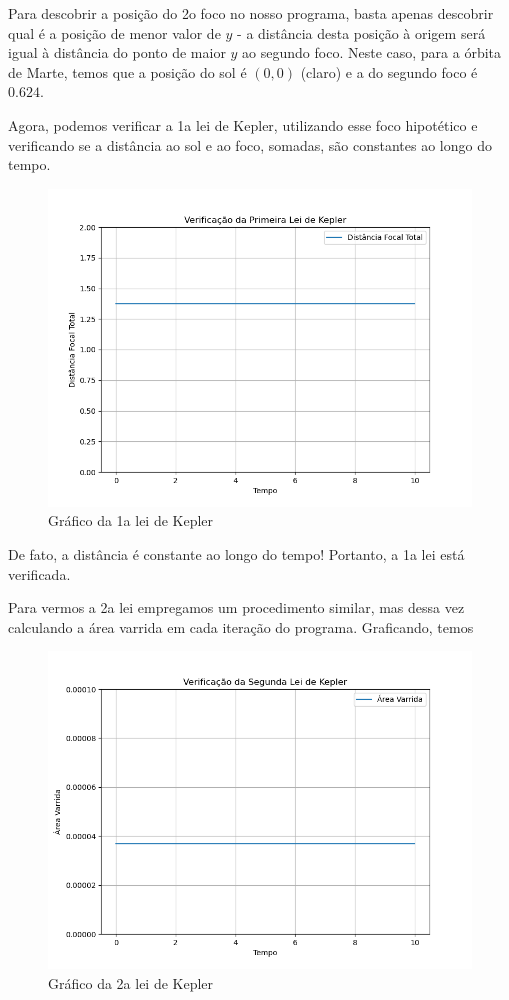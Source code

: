 \documentclass[12pt,a4paper]{article}
\begin{document}
Para descobrir a posição do 2o foco no nosso programa, basta apenas descobrir qual é a posição de menor valor de $y$ - a distância desta posição à origem será igual à distância do ponto de maior $y$ ao segundo foco. Neste caso, para a órbita de Marte, temos que a posição do sol é $(0,0)$ (claro) e a do segundo foco é $0.624$.

Agora, podemos verificar a 1a lei de Kepler, utilizando esse foco hipotético e verificando se a distância ao sol e ao foco, somadas, são constantes ao longo do tempo.

\begin{figure}[H]
\centering
\includegraphics[width=\linewidth]{../tarefa-2a/1alei.png}
\caption{Gráfico da 1a lei de Kepler}
\end{figure}

De fato, a distância é constante ao longo do tempo! Portanto, a 1a lei está verificada.

Para vermos a 2a lei empregamos um procedimento similar, mas dessa vez calculando a área varrida em cada iteração do programa. Graficando, temos

\begin{figure}[H]
\centering
\includegraphics[width=\linewidth]{../tarefa-2a/2alei.png}
\caption{Gráfico da 2a lei de Kepler}
\end{figure}
\end{document}
